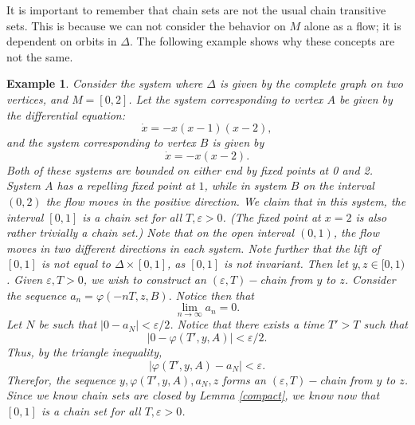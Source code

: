 \documentclass[11pt]{article}
\newtheorem{ex}[thm]{Example}
\begin{document}
\indent It is important to remember that chain sets are not the usual chain transitive sets.
This is because we can not consider the behavior on $M$ alone as a flow; it is dependent on orbits in $\Delta$. The following example shows why these concepts are not the same.

\begin{ex}
Consider the system where $\Delta$ is given by the complete graph on two vertices, and $M=[0,2]$.  Let the system corresponding to vertex $A$ be given by the differential equation:
$$\dot{x}=-x(x-1)(x-2),$$
and the system corresponding to vertex $B$ is given by 
$$\dot{x}=-x(x-2).$$
Both of these systems are bounded on either end by fixed points at 0 and 2.  System $A$ has a repelling fixed point at $1$, while in system $B$ on the interval $(0,2)$ the flow moves in the positive direction.  We claim that in this system, the interval $[0,1]$ is a chain set for all $T, \varepsilon>0$.  (The fixed point at $x=2$ is also rather trivially a chain set.) Note that on the open interval $(0,1)$, the flow moves in two different directions in each system.  Note further that the lift of $[0,1]$ is not equal to $\Delta\times [0,1]$, as $[0,1]$ is not invariant.  Then let $y,z\in [0,1)$.  Given $\varepsilon,T>0$, we wish to construct an $(\varepsilon,T)-$chain from $y$ to $z$.  Consider the sequence $a_n=\varphi(-nT,z,B).$ Notice then that 
$$\lim_{n\rightarrow\infty}a_n=0.$$
Let $N$ be such that $|0-a_N|<\varepsilon/2$. Notice that there exists a time $T'>T$ such that $$|0-\varphi(T',y,A)|<\varepsilon/2.$$ Thus, by the triangle inequality, 
$$|\varphi(T',y,A)-a_N|<\varepsilon.$$
Therefor, the sequence $y, \varphi(T',y,A),a_N,z$ forms an $(\varepsilon,T)-$chain from $y$ to $z$.  Since we know chain sets are closed by Lemma \ref{compact}, we know now that $[0,1]$ is a chain set for all $T,\varepsilon>0$. \\

\end{ex}
\end{document}
